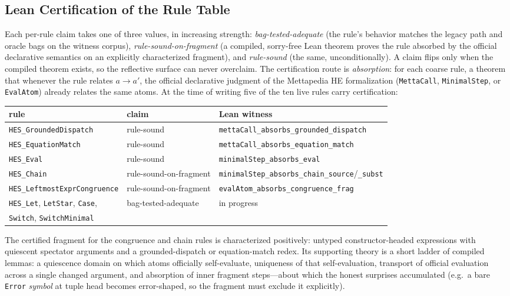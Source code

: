 \documentclass[11pt]{article}
\newcommand{\code}[1]{\texttt{#1}}
\newcommand{\HE}{\textup{HE}}
\begin{document}
\subsection{Lean Certification of the Rule Table}
\label{sec:rulecert}

Each per-rule claim takes one of three values, in increasing strength:
\emph{bag-tested-adequate} (the rule's behavior matches the legacy
path and oracle bags on the witness corpus),
\emph{rule-sound-on-fragment} (a compiled, sorry-free Lean theorem
proves the rule absorbed by the official declarative semantics on an
explicitly characterized fragment), and \emph{rule-sound} (the same,
unconditionally).  A claim flips only when the compiled theorem
exists, so the reflective surface can never overclaim.  The
certification route is \emph{absorption}: for each coarse rule, a
theorem that whenever the rule relates $a \to a'$, the official
declarative judgment of the Mettapedia \HE{} formalization
(\code{MettaCall}, \code{MinimalStep}, or \code{EvalAtom}) already
relates the same atoms.  At the time of writing five of the ten live
rules carry certification:

\begin{center}\footnotesize
\begin{tabular}{lll}
\toprule
rule & claim & Lean witness \\
\midrule
\code{HES\_GroundedDispatch} & rule-sound &
  \code{mettaCall\_absorbs\_grounded\_dispatch} \\
\code{HES\_EquationMatch} & rule-sound &
  \code{mettaCall\_absorbs\_equation\_match} \\
\code{HES\_Eval} & rule-sound &
  \code{minimalStep\_absorbs\_eval} \\
\code{HES\_Chain} & rule-sound-on-fragment &
  \code{minimalStep\_absorbs\_chain\_source}/\code{\_subst} \\
\code{HES\_LeftmostExprCongruence} & rule-sound-on-fragment &
  \code{evalAtom\_absorbs\_congruence\_frag} \\
\code{HES\_Let}, \code{LetStar}, \code{Case}, & bag-tested-adequate &
  in progress \\
\quad\code{Switch}, \code{SwitchMinimal} & & \\
\bottomrule
\end{tabular}
\end{center}

The certified fragment for the congruence and chain rules is
characterized positively: untyped constructor-headed expressions with
quiescent spectator arguments and a grounded-dispatch or
equation-match redex.  Its supporting theory is a short ladder of
compiled lemmas: a quiescence domain on which atoms officially
self-evaluate, uniqueness of that self-evaluation, transport of
official evaluation across a single changed argument, and absorption
of inner fragment steps---about which the honest surprises accumulated
(e.g.\ a bare \code{Error} \emph{symbol} at tuple head becomes
error-shaped, so the fragment must exclude it explicitly).
\end{document}
